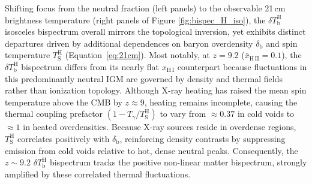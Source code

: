 \documentclass[apj,twocolumn, appendixfloats, twocolappendix, numberedappendix, tighten]{openjournal}
\begin{document}
Shifting focus from the neutral fraction (left panels) to the observable 21\,cm brightness temperature (right panels of Figure \ref{fig:bispec_H_iso}), the $\delta T_\mathrm{b}^\mathrm{H}$  isosceles bispectrum overall mirrors the topological inversion, yet exhibits distinct departures driven by additional dependences on baryon overdensity $\delta_\mathrm{b}$ and spin temperature $T_\mathrm{S}^\mathrm{H}$ (Equation~\ref{eq:21cm}). Most notably, at $z = 9.2$ ($\bar{x}_\mathrm{H\,II} = 0.1$), the $\delta T_\mathrm{b}^\mathrm{H}$ bispectrum differs from its nearly flat $x_\mathrm{H\,I}$ counterpart because fluctuations in this predominantly neutral IGM are governed by density and thermal fields rather than ionization topology. Although X-ray heating has raised the mean spin temperature above the CMB by $z \approx 9$, heating remains incomplete, causing the thermal coupling prefactor $(1 - T_\gamma/T_\mathrm{S}^\mathrm{H})$ to vary from $\approx 0.37$ in cold voids to $\approx 1$ in heated overdensities. Because X-ray sources reside in overdense regions, $T_\mathrm{S}^\mathrm{H}$ correlates positively with $\delta_\mathrm{b}$, reinforcing density contrasts by suppressing emission from cold voids relative to hot, dense neutral peaks. Consequently, the $z \sim 9.2$ $\delta T_\mathrm{b}^\mathrm{H}$ bispectrum tracks the positive non-linear matter bispectrum, strongly amplified by these correlated thermal fluctuations.




\end{document}
